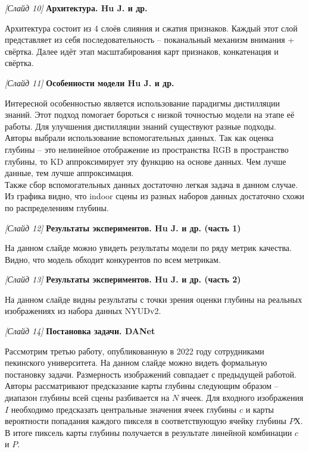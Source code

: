 \documentclass[a4paper, 14pt]{extarticle}
\begin{document}
	
	\textit{[Слайд 10]} \textbf{Архитектура. Hu J. и др.}
	
	Архитектура состоит из 4 слоёв слияния и сжатия признаков. Каждый этот слой представляет из себя последовательность -- поканальный механизм внимания + свёртка. Далее идёт этап масштабирования карт признаков, конкатенация и свёртка. 
	\bigskip
	
	
	\textit{[Слайд 11]} \textbf{Особенности модели Hu J. и др.}
	
	Интересной особенностью является использование парадигмы дистилляции знаний. Этот подход помогает бороться с низкой точностью модели на этапе её работы. Для улучшения дистилляции знаний существуют разные подходы. Авторы выбрали использование вспомогательных данных. Так как оценка глубины -- это нелинейное отображение из пространства RGB в пространство глубины, то KD аппроксимирует эту функцию на основе данных. Чем лучше данные, тем лучше аппроксимация. \\ Также сбор вспомогательных данных достаточно легкая задача в данном случае. Из графика видно, что indoor сцены из разных наборов данных достаточно схожи по распределениям глубины.  
	\bigskip
	
	
	\textit{[Слайд 12]} \textbf{Результаты экспериментов. Hu J. и др. (часть 1)}
	
	На данном слайде можно увидеть результаты модели по ряду метрик качества. Видно, что модель обходит конкурентов по всем метрикам. 
	\bigskip
	
	
	\textit{[Слайд 13]} \textbf{Результаты экспериментов. Hu J. и др. (часть 2)}
	
	На данном слайде видны результаты с точки зрения оценки глубины на реальных изображениях из набора данных NYUDv2.
	\bigskip
	
	
	\textit{[Слайд 14]} \textbf{Постановка задачи. DANet}
	
	Рассмотрим третью работу, опубликованную в 2022 году сотрудниками пекинского университета. На данном слайде можно видеть формальную постановку задачи. Размерность изображений совпадает с предыдущей работой. Авторы рассматривают предсказание карты глубины следующим образом -- диапазон глубины всей сцены разбивается на $N$ ячеек. Для входного изображения $I$ необходимо предсказать центральные значения ячеек глубины $c$ и карты вероятности попадания каждого пикселя в соответствующую ячейку глубины $PХ$. В итоге пиксель карты глубины получается в результате линейной комбинации $c$ и $P$. 
	\bigskip
	
\end{document}
